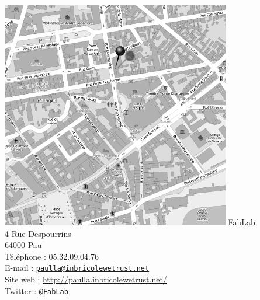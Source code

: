 \begin{center}
  \vfill
  \includegraphics[width=10cm]{carte.png}
  \vfill
  FabLab\\
  4 Rue Despourrins\\
  64000 Pau\\
  \vfill
  \medskip Téléphone : 05.32.09.04.76\\ %
  \medskip E-mail : \href{mailto:paulla@inbricolewetrust.net}{\texttt{paulla@inbricolewetrust.net}}\\%
  \medskip Site web : \url{http://paulla.inbricolewetrust.net/}\\%
  \medskip Twitter : \href{https://twitter.com/FabLab}{\texttt{@FabLab}}
  \vfill
\end{center}
